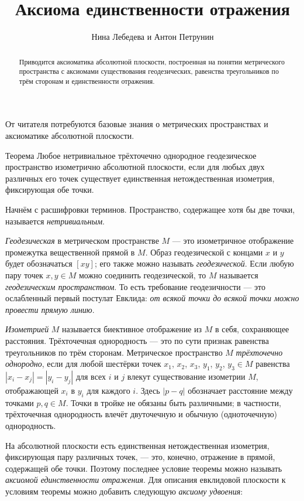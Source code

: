 \documentclass[a4paper,10pt]{article}
\def\thetitle{Аксиома единственности отражения}
\def\theauthors{Нина Лебедева и Антон Петрунин}
\begin{document}
\title{\thetitle}
\author{\theauthors}
\date{}
\maketitle


\begin{abstract}
Приводится аксиоматика абсолютной плоскости, построенная на понятии метрического пространства с аксиомами существования геодезических, равенства треугольников по трём сторонам и единственности отражения.
\end{abstract}

От читателя потребуются базовые знания о метрических пространствах и аксиоматике абсолютной плоскости.

\begin{thm}{Теорема}\label{thm:main}
Любое нетривиальное трёхточечно однородное геодезическое пространство изометрично абсолютной плоскости,
если для любых двух различных его точек существует единственная нетождественная изометрия, фиксирующая обе точки.
\end{thm}

Начнём с расшифровки терминов.
Пространство, содержащее хотя бы две точки, называется \emph{нетривиальным}.

\emph{Геодезическая} в метрическом пространстве $M$ --- это изометричное отображение промежутка вещественной прямой в $M$.
Образ геодезической с концами $x$ и $y$ будет обозначаться $[xy]$; его также можно называть \emph{геодезической}.
Если любую пару точек $x,y\in M$ можно соединить геодезической, то $M$ называется \emph{геодезическим пространством}.
То есть требование геодезичности --- это ослабленный первый постулат Евклида: \textit{от всякой точки до всякой точки можно провести прямую линию}.

\emph{Изометрией} $M$ называется биективное отображение из $M$ в себя, сохраняющее расстояния.
Трёхточечная однородность --- это по сути признак равенства треугольников по трём сторонам.
Метрическое пространство $M$ \emph{трёхточечно однородно}, если для любой шестёрки точек $x_1$, $x_2$, $x_3$, $y_1$, $y_2$, $y_3\in M$ равенства $|x_i-x_j|=|y_i-y_j|$ для всех $i$ и $j$ влекут существование изометрии $M$, отображающей $x_i$ в $y_i$ для каждого $i$.
Здесь $|p-q|$ обозначает расстояние между точками $p,q\in M$.
Точки в тройке не обязаны быть различными; в частности, трёхточечная однородность влечёт двуточечную и обычную (одноточечную) однородность.

На абсолютной плоскости есть единственная нетождественная изометрия, фиксирующая пару различных точек, --- это, конечно, отражение в прямой, содержащей обе точки.
Поэтому последнее условие теоремы можно называть \emph{аксиомой единственности отражения}.
Для описания евклидовой плоскости к условиям теоремы можно добавить следующую \emph{аксиому удвоения}:
\end{document}
